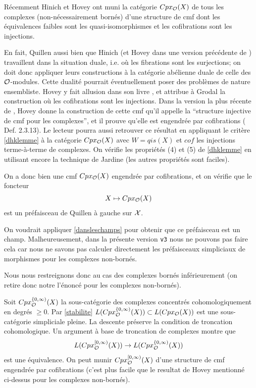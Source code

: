 \documentclass[12pt]{article}
\newcommand{\Oo}{{\cal O}}
\newcommand{\Xx}{{\cal X}}
\begin{document}
R\'ecemment Hinich \cite{Hinich2} et Hovey \cite{HoveyBook} ont muni
la cat\'egorie $Cpx_{\Oo}(X)$ de tous les complexes (non-n\'ecessairement
born\'es) d'une structure de cmf dont les
\'equivalences faibles sont les quasi-isomorphismes et les cofibrations
sont les injections.

En fait, Quillen aussi bien que Hinich (et Hovey dans une version
pr\'ec\'edente de \cite{HoveyBook})
travaillent dans la situation duale, i.e. o\`u les fibrations sont les
surjections; on doit donc
appliquer leurs constructions
\`a la cat\'egorie ab\'elienne duale de celle des $\Oo$-modules.  Cette
dualit\'e pourrait
\'eventuellement
poser des probl\`emes de nature ensembliste. Hovey y fait allusion dans
son livre
\cite{HoveyBook}, et attribue \`a Grodal
la construction o\`u les cofibrations sont
les injections.
Dans la version la plus r\'ecente de \cite{HoveyBook}, Hovey donne la
construction de cette cmf qu'il
appelle la ``structure injective de cmf pour les complexes'', et il prouve
qu'elle est engendr\'ee
par cofibrations
(\cite{HoveyBook} Def. 2.3.13).
Le lecteur pourra aussi retrouver ce r\'esultat en appliquant le crit\`ere
\ref{dhklemme}
\`a la cat\'egorie $Cpx_{\Oo}(X)$ avec $W = qis(X)$ et $cof$ les injections
terme-\`a-terme de complexes. On v\'erifie les propri\'et\'es (4) et (5) de
\ref{dhklemme}
en utilisant encore la technique de Jardine \cite{Jardine} (les autres
propri\'et\'es sont
faciles).



On a donc bien une cmf $Cpx_{\Oo}(X)$ engendr\'ee par cofibrations, et on
v\'erifie que le foncteur
$$
X\mapsto Cpx_{\Oo}(X)
$$
est un pr\'efaisceau de Quillen \`a gauche sur $\Xx$. 


On voudrait appliquer
\ref{dansleschamps} pour obtenir que ce pr\'efaisceau est un champ.
Malheureusement, dans la pr\'esente version {\tt v3} nous ne pouvons
pas faire cela car nous ne savons pas calculer directement les
pr\'efaisceaux simpliciaux de morphismes pour les complexes non-born\'es.

Nous nous restreignons donc au cas des complexes born\'es inf\'erieurement
(on retire donc  notre l'\'enonc\'e pour les complexes non-born\'es).

Soit $Cpx_{\Oo}^{\{ 0,\infty )}(X)$ la sous-cat\'egorie des complexes
concentr\'es
cohomologiquement en degr\'es $\geq 0$.
 Par \ref{stabilite} $L(Cpx_{\Oo}^{\{ 0,\infty )}(X))\subset
L(Cpx_{\Oo}(X))$ est une sous-cat\'egorie simpliciale pleine.
La descente pr\'eserve la condition de troncation cohomologique. Un argument
\`a base de troncation de complexes montre que
$$
L(Cpx_{\Oo}^{[0,\infty )}(X))\rightarrow L(Cpx_{\Oo}^{\{ 0,\infty )}(X))
$$
est une \'equivalence. On peut munir $Cpx_{\Oo}^{[0,\infty )}(X)$ d'une
structure de cmf engendr\'ee par cofibrations (c'est plus facile que le
resultat de Hovey mentionn\'e ci-dessus pour les complexes non-born\'es). 
\end{document}
